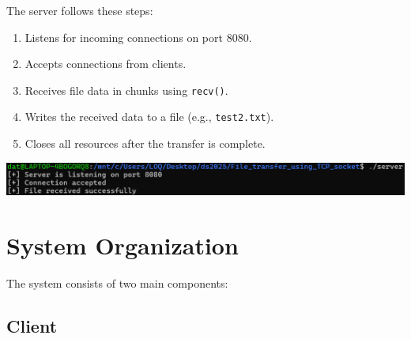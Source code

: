 \documentclass{article}
\begin{document}
The server follows these steps:

\begin{enumerate}
    \item Listens for incoming connections on port 8080.
    \item Accepts connections from clients.
    \item Receives file data in chunks using \texttt{recv()}.
    \item Writes the received data to a file (e.g., \texttt{test2.txt}).
    \item Closes all resources after the transfer is complete.
\end{enumerate}

\includegraphics[width=1\linewidth]{server}

\section{System Organization}

The system consists of two main components:

\subsection{Client}
\end{document}
